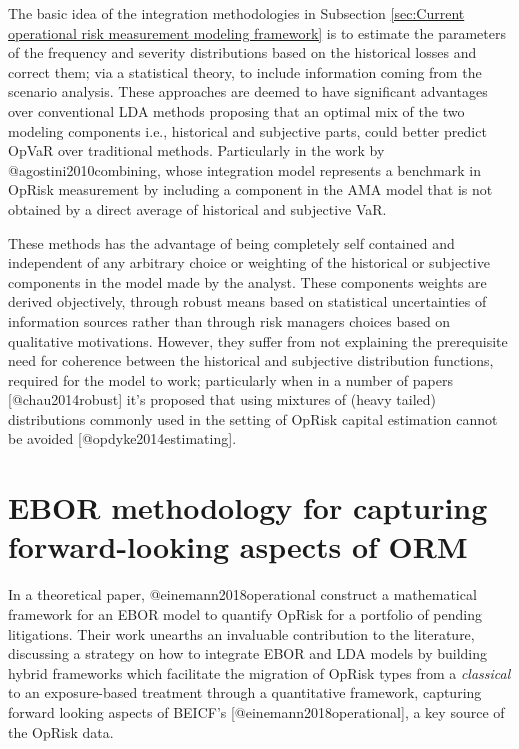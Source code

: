 \documentclass[]{article}
\begin{document}
The basic idea of the integration methodologies in Subsection
\ref{sec:Current operational risk measurement modeling framework} is to
estimate the parameters of the frequency and severity distributions
based on the historical losses and correct them; via a statistical
theory, to include information coming from the scenario analysis. These
approaches are deemed to have significant advantages over conventional
LDA methods proposing that an optimal mix of the two modeling components
i.e., historical and subjective parts, could better predict OpVaR over
traditional methods. Particularly in the work by @agostini2010combining,
whose integration model represents a benchmark in OpRisk measurement by
including a component in the AMA model that is not obtained by a direct
average of historical and subjective VaR.\medskip

These methods has the advantage of being completely self contained and
independent of any arbitrary choice or weighting of the historical or
subjective components in the model made by the analyst. These components
weights are derived objectively, through robust means based on
statistical uncertainties of information sources rather than through
risk managers choices based on qualitative motivations. However, they
suffer from not explaining the prerequisite need for coherence between
the historical and subjective distribution functions, required for the
model to work; particularly when in a number of papers
{[}@chau2014robust{]} it's proposed that using mixtures of (heavy
tailed) distributions commonly used in the setting of OpRisk capital
estimation cannot be avoided {[}@opdyke2014estimating{]}.\medskip

\section{EBOR methodology for capturing forward-looking aspects of ORM}
\label{sec:EBOR methodology for capturing forward-looking aspects of ORM}

In a theoretical paper, @einemann2018operational construct a
mathematical framework for an EBOR model to quantify OpRisk for a
portfolio of pending litigations. Their work unearths an invaluable
contribution to the literature, discussing a strategy on how to
integrate EBOR and LDA models by building hybrid frameworks which
facilitate the migration of OpRisk types from a \emph{classical} to an
exposure-based treatment through a quantitative framework, capturing
forward looking aspects of BEICF's {[}@einemann2018operational{]}, a key
source of the OpRisk data.\medskip
\end{document}
